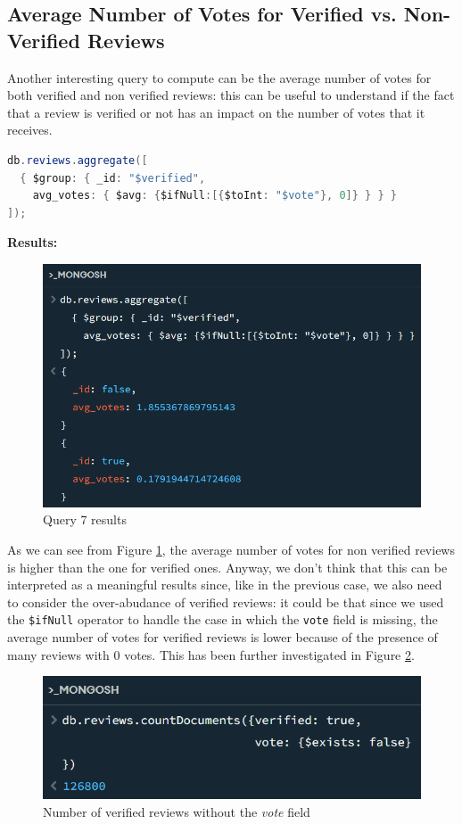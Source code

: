 \newpage
\subsection{Average Number of Votes for Verified vs. Non-Verified Reviews}
Another interesting query to compute can be the average number of votes for both verified and non verified reviews: this can be useful to understand if the fact that a review is verified or not has an impact on the number of votes that it receives. \\
\begin{lstlisting}[language=Java]
db.reviews.aggregate([
  { $group: { _id: "$verified", 
    avg_votes: { $avg: {$ifNull:[{$toInt: "$vote"}, 0]} } } }
]);
\end{lstlisting}
\textbf{Results:}
\begin{figure}[H]
  \centering
  \includegraphics[scale=0.7]{Images/q7_result.png}
  \caption{Query 7 results}
  \label{fig:q7_result}
\end{figure}
As we can see from Figure \ref{fig:q7_result}, the average number of votes for non verified reviews is higher than the one for verified ones. 
Anyway, we don't think that this can be interpreted as a meaningful results since, like in the previous case, we also need to consider the over-abudance of verified reviews: it could be that since we used the \texttt{\$ifNull} operator to handle the case in which the \texttt{vote} field is missing, the average number of votes for verified reviews is lower because of the presence of many reviews with 0 votes.
This has been further investigated in Figure \ref{fig:q7_result_spec}. \\
\begin{figure}[H]
  \centering
  \includegraphics[scale=0.7]{Images/q7_result_spec.png}
  \caption{Number of verified reviews without the \textit{vote} field}
  \label{fig:q7_result_spec}
\end{figure}

